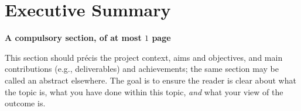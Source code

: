 \documentclass[ %
                    author={Samuel Russell},
                supervisor={Prof. Bogdan Warinschi},
                    degree={MEng},
                     title={Innocuous Ciphertexts},
                  subtitle={The DE-CENSOR Scheme},
                      type={research},
                      year={2018} ]{dissertation}
\begin{document}


\maketitle


\frontmatter


\makedecl


\tableofcontents




\chapter*{Executive Summary}

{\bf A compulsory section, of at most $1$ page} 
\vspace{1cm} 

\noindent
This section should pr\'{e}cis the project context, aims and objectives,
and main contributions (e.g., deliverables) and achievements; the same 
section may be called an abstract elsewhere.  The goal is to ensure the 
reader is clear about what the topic is, what you have done within this 
topic, {\em and} what your view of the outcome is.
\end{document}

